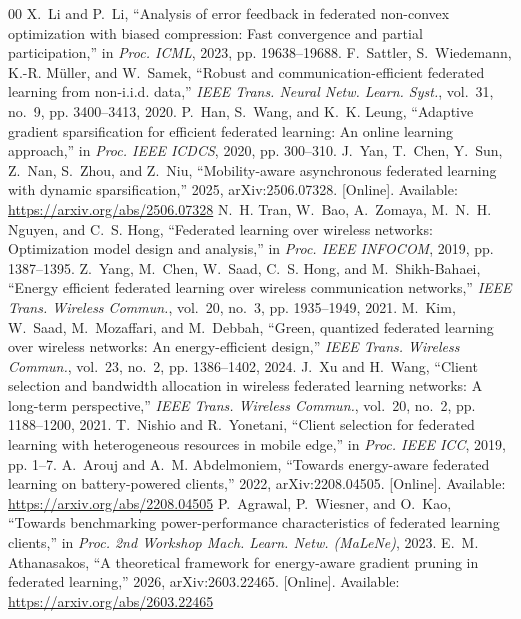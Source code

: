 \documentclass[conference,a4paper]{IEEEtran}
\begin{document}
\begin{thebibliography}{00}
 X.~Li and P.~Li, ``Analysis of error feedback in federated non-convex optimization with biased compression: Fast convergence and partial participation,'' in \emph{Proc. ICML}, 2023, pp. 19638--19688.
 F.~Sattler, S.~Wiedemann, K.-R. M\"uller, and W.~Samek, ``Robust and communication-efficient federated learning from non-i.i.d. data,'' \emph{IEEE Trans. Neural Netw. Learn. Syst.}, vol.~31, no.~9, pp. 3400--3413, 2020.
 P.~Han, S.~Wang, and K.~K. Leung, ``Adaptive gradient sparsification for efficient federated learning: An online learning approach,'' in \emph{Proc. IEEE ICDCS}, 2020, pp. 300--310.
 J.~Yan, T.~Chen, Y.~Sun, Z.~Nan, S.~Zhou, and Z.~Niu, ``Mobility-aware asynchronous federated learning with dynamic sparsification,'' 2025, arXiv:2506.07328. [Online]. Available: \url{https://arxiv.org/abs/2506.07328}
 N.~H. Tran, W.~Bao, A.~Zomaya, M.~N.~H. Nguyen, and C.~S. Hong, ``Federated learning over wireless networks: Optimization model design and analysis,'' in \emph{Proc. IEEE INFOCOM}, 2019, pp. 1387--1395.
 Z.~Yang, M.~Chen, W.~Saad, C.~S. Hong, and M.~Shikh-Bahaei, ``Energy efficient federated learning over wireless communication networks,'' \emph{IEEE Trans. Wireless Commun.}, vol.~20, no.~3, pp. 1935--1949, 2021.
 M.~Kim, W.~Saad, M.~Mozaffari, and M.~Debbah, ``Green, quantized federated learning over wireless networks: An energy-efficient design,'' \emph{IEEE Trans. Wireless Commun.}, vol.~23, no.~2, pp. 1386--1402, 2024.
 J.~Xu and H.~Wang, ``Client selection and bandwidth allocation in wireless federated learning networks: A long-term perspective,'' \emph{IEEE Trans. Wireless Commun.}, vol.~20, no.~2, pp. 1188--1200, 2021.
 T.~Nishio and R.~Yonetani, ``Client selection for federated learning with heterogeneous resources in mobile edge,'' in \emph{Proc. IEEE ICC}, 2019, pp. 1--7.
 A.~Arouj and A.~M. Abdelmoniem, ``Towards energy-aware federated learning on battery-powered clients,'' 2022, arXiv:2208.04505. [Online]. Available: \url{https://arxiv.org/abs/2208.04505}
 P.~Agrawal, P.~Wiesner, and O.~Kao, ``Towards benchmarking power-performance characteristics of federated learning clients,'' in \emph{Proc. 2nd Workshop Mach. Learn. Netw. (MaLeNe)}, 2023.
 E.~M. Athanasakos, ``A theoretical framework for energy-aware gradient pruning in federated learning,'' 2026, arXiv:2603.22465. [Online]. Available: \url{https://arxiv.org/abs/2603.22465}

\end{thebibliography}
\end{document}
